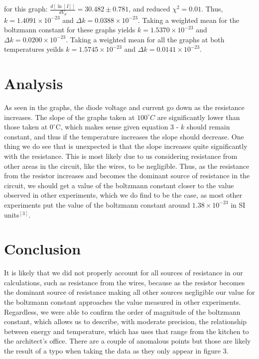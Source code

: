 \documentclass[12pt, a4paper]{article}
\begin{document}
	for this graph: $\frac{d[\ln [I]]}{dV_d} = 30.482 \pm 0.781$, and reduced $\chi^2 = 0.01$. Thus, $k = 1.4091 \times 10^{-23}$ and $\Delta k = 0.0388 \times 10^{-23}$.
	\linebreak
	\linebreak
	Taking a weighted mean for the boltzmann constant for these graphs yields $k = 1.5370 \times 10^{-23}$ and $\Delta k = 0.0200 \times 10^{-23}$. Taking a weighted mean for all the graphs at both temperatures yeilds $k = 1.5745 \times 10^{-23}$ and $\Delta k = 0.0141 \times 10^{-23}$.

\section{Analysis}
	As seen in the graphs, the diode voltage and current go down as the resistance increases. The slope of the graphs taken at $100^{\circ}C$ are significantly lower than those taken at $0^{\circ}$C, which makes sense given equation 3 - $k$ should remain constant, and thus if the temperature increases the slope should decrease. One thing we do see that is unexpected is that the slope increases quite significantly with the resistance. This is most likely due to us considering resistance from other areas in the circuit, like the wires, to be negligible. Thus, as the resistance from the resistor increases and becomes the dominant source of resistance in the circuit, we should get a value of the boltzmann constant closer to the value observed in other experiments, which we do find to be the case, as most other experiments put the value of the boltzmann constant around $1.38 \times 10^{-23}$ in SI units$^{[3]}$. 

\section{Conclusion}
	It is likely that we did not properly account for all sources of resistance in our calculations, such as resistance from the wires, because as the resistor becomes the dominant source of resistance making all other sources negligible our value for the boltzmann constant approaches the value measured in other experiments. Regardless, we were able to confirm the order of magnitude of the boltzmann constant, which allows us to describe, with moderate precision, the relationship between energy and temperature, which has uses that range from the kitchen to the architect's office. There are a couple of anomalous points but those are likely the result of a typo when taking the data as they only appear in figure 3. 
\end{document}

